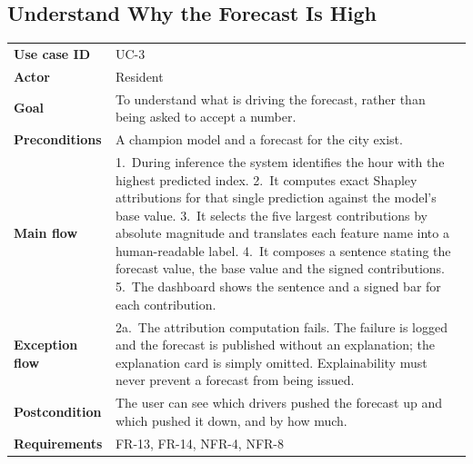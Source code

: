 \subsection{Understand Why the Forecast Is High}
\begin{xltabular}{\textwidth}{Q{2.9cm} Y}
\toprule
\bfseries Use case ID & UC-3 \\
\bfseries Actor & Resident \\
\bfseries Goal & To understand what is driving the forecast, rather than being
asked to accept a number. \\
\bfseries Preconditions & A champion model and a forecast for the city exist. \\
\bfseries Main flow & 1.~During inference the system identifies the hour with the
highest predicted index. 2.~It computes exact Shapley attributions for that
single prediction against the model's base value. 3.~It selects the five largest
contributions by absolute magnitude and translates each feature name into a
human-readable label. 4.~It composes a sentence stating the forecast value, the
base value and the signed contributions. 5.~The dashboard shows the sentence and
a signed bar for each contribution. \\
\bfseries Exception flow & 2a.~The attribution computation fails. The failure is
logged and the forecast is published without an explanation; the explanation card
is simply omitted. Explainability must never prevent a forecast from being
issued. \\
\bfseries Postcondition & The user can see which drivers pushed the forecast up
and which pushed it down, and by how much. \\
\bfseries Requirements & FR-13, FR-14, NFR-4, NFR-8 \\
\bottomrule
\end{xltabular}

